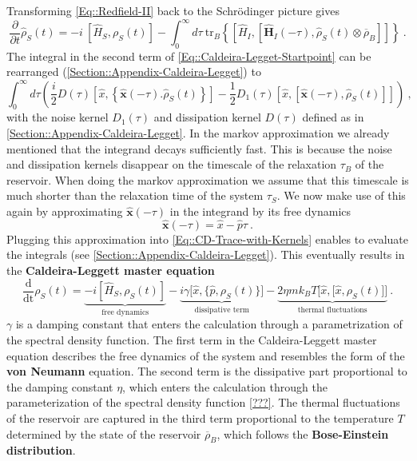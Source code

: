 		Transforming \autoref{Eq::Redfield-II} back to the Schrödinger picture gives
		\begin{equation} \label{Eq::Caldeira-Legget-Startpoint}
			\frac{\partial}{\partial t} {\hat{\rho}}_S(t) =	-i~\left[\hat{H}_S, \rho_S(t)\right] - \int_{0}^{\infty} d\tau~ \text{tr}_B \left\{  \left[{\hat{H}}_I, \left[{\boldsymbol{\hat{H}}}_I(- \tau), {\hat{\rho}}_S(t) \otimes \overline{\rho}_B \right]\right]  \right\}~.
		\end{equation}
		The integral in the second term of \autoref{Eq::Caldeira-Legget-Startpoint} can be rearranged (\autoref{Section::Appendix-Caldeira-Legget}) to 
		\begin{equation} \label{Eq::CD-Trace-with-Kernels}
			\int_{0}^{\infty} d\tau \left(\frac{i}{2} D(\tau) \left[\hat{x}, \left\{\boldsymbol{\hat{x}}(-\tau). \hat{\rho}_S(t)\right\}\right] - \frac{1}{2} D_1(\tau) \left[\hat{x}, \left[\boldsymbol{\hat{x}}(-\tau) , \hat{\rho}_S(t)\right]\right]\right)~,
		\end{equation}
		with the noise kernel $D_1(\tau)$ and dissipation kernel $D(\tau)$ defined as in \autoref{Section::Appendix-Caldeira-Legget}. In the markov approximation we already mentioned that the integrand decays sufficiently fast. This is because the noise and dissipation kernels disappear on the timescale of the relaxation $\tau_B$ of the reservoir. When doing the markov approximation we assume that this timescale is much shorter than the relaxation time of the system $\tau_S$. We now make use of this again by approximating $\boldsymbol{\hat{x}}(-\tau)$ in the integrand by its free dynamics
		\begin{equation}
			\boldsymbol{\hat{x}}(-\tau) =	\hat{x} - \hat{p} \tau~.
		\end{equation}
		Plugging this approximation into \autoref{Eq::CD-Trace-with-Kernels} enables to evaluate the integrals (see \autoref{Section::Appendix-Caldeira-Legget}). This eventually results in the \textbf{Caldeira-Leggett master equation}
		\begin{equation} \label{Eq::Caldeira-Leggett-Master-equation}
			\frac{\text{d}}{\text{dt}} \rho_S(t) =	\underbrace{-i\left[\hat{H}_S, \rho_S(t) \right]}_{\text{free dynamics}} - \underbrace{i \gamma \Big [\hat{x}, \big\{\hat{p}, \rho_S(t)\big\}\Big ]}_\text{dissipative term} - \underbrace{2 \eta m k_B T \Big [\hat{x}, \big[\hat{x}, \rho_S(t)\big]\Big ]}_\text{thermal fluctuations}~.
		\end{equation}
	$\gamma$ is a damping constant that enters the calculation through a parametrization of the spectral density function. The first term in the Caldeira-Leggett master equation describes the free dynamics of the system and resembles the form of the \textbf{von Neumann} equation. The second term is the dissipative part proportional to the damping constant $\eta$, which enters the calculation through the parameterization of the spectral density function \autoref{???}. The thermal fluctuations of the reservoir are captured in the third term proportional to the temperature $T$ determined by the state of the reservoir $\overline{\rho}_B$, which follows the \textbf{Bose-Einstein distribution}.	

